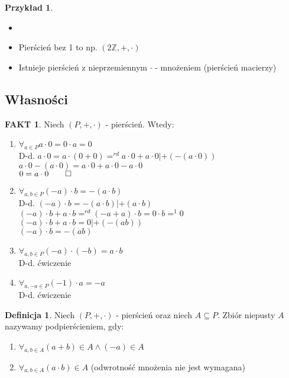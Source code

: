 \documentclass{article}
\theoremstyle{definition}
\newtheorem{de}{Definicja}[subsection]
\theoremstyle{definition}
\theoremstyle{definition}
\newtheorem{pk}{Przykład}[subsection]
\theoremstyle{definition}
\newtheorem*{fakt}{FAKT}
\begin{document}
\begin{pk}
\begin{itemize}
\item[]
\item Pierścień bez 1 to np. $(2\mathbb{Z},+,\cdot)$
\item Istnieje pierścień z nieprzemiennym $\cdot$ - mnożeniem (pierścień macierzy) 
\end{itemize}
\end{pk}

\subsection{Własności}

\begin{fakt}
Niech $(P,+,\cdot)$ - pierścień. Wtedy:
\begin{enumerate}
\item $\forall_{a\in P} a\cdot 0=0\cdot a = 0$\\
D-d. $a\cdot 0=a\cdot(0+0)=^{rd} a\cdot 0 + a\cdot 0 | +(-(a\cdot 0))$\\
$a\cdot 0 - (a\cdot 0) = a\cdot 0 + a\cdot 0 - a\cdot 0$\\
$0=a\cdot 0 \qed$
\item $\forall_{a,b\in P} (-a)\cdot b=-(a\cdot b)$\\
D-d. $(-a)\cdot b=-(a\cdot b) | + (a\cdot b)$\\
$(-a)\cdot b + a\cdot b =^{rd} (-a + a)\cdot b = 0\cdot b=^{1} 0$\\
$(-a)\cdot b+ a\cdot b=0 |+(-(ab))$\\
$(-a)\cdot b = -(ab)$
\item $\forall_{a,b\in P} (-a)\cdot (-b) = a\cdot b$\\
D-d. ćwiczenie
\item $\forall_{a,-a\in P} (-1)\cdot a = -a$\\
D-d. ćwiczenie
\end{enumerate}
\end{fakt}

\begin{de}
Niech $(P,+,\cdot)$ - pierścień oraz niech $A\subseteq P$. Zbiór niepusty $A$ nazywamy podpierścieniem, gdy:
\begin{enumerate}
\item $\forall_{a,b\in A} (a+b)\in A \land (-a)\in A$
\item $\forall_{a,b\in A} (a\cdot b)\in A$ (odwrotność mnożenia nie jest wymagana)
\end{enumerate}
\end{de}
\end{document}
